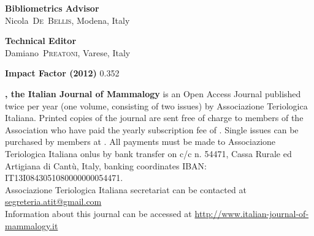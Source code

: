 {  %
  \par\vspace{\hysspacersmall}
  \noindent\textbf{Bibliometrics Advisor}\\
  {\hysLarge Nicola~\textsc{De~Bellis}}, Modena, Italy\\
  \par\vspace{\hysspacersmall}
  \noindent\textbf{Technical Editor}\\
  {\Large Damiano~\textsc{Preatoni}}, Varese, Italy\\
  \par\vspace{\hysspacersmall}
  \noindent\textbf{Impact Factor (2012)} 0.352\\
  \par%
  \vfill
  \begin{footnotesize}
  \textbf{, the Italian Journal of Mammalogy} is an Open Access Journal published twice per year (one volume, consisting of two issues) by Associazione Teriologica Italiana. Printed copies of the journal are sent free of charge to members of the Association who have paid the yearly subscription fee of . Single issues can be purchased by members at . All payments must be made to Associazione Teriologica Italiana onlus by bank transfer on c/c n. 54471, Cassa Rurale ed Artigiana di Cantù, Italy, banking coordinates IBAN: IT13I0843051080000000054471.\\
  
  \noindent Associazione Teriologica Italiana secretariat can be contacted at \url{segreteria.atit@gmail.com}\\
  
  \noindent Information about this journal can be accessed at \url{http://www.italian-journal-of-mammalogy.it}\\
  

\end{footnotesize}}
